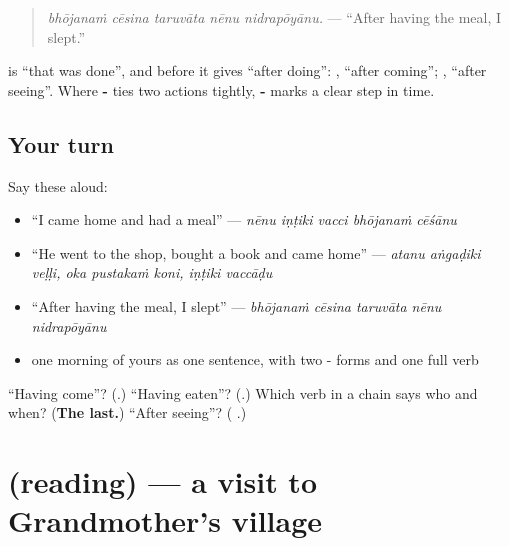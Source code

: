 \begin{quote}
\emph{bhōjanaṁ cēsina taruvāta nēnu nidrapōyānu.} — \textquotedblleft{}After having the meal, I slept.\textquotedblright{}
\end{quote}

\textbf{} is \textquotedblleft{}that was done\textquotedblright{}, and before \textbf{} it gives \textquotedblleft{}after doing\textquotedblright{}: \textbf{ }, \textquotedblleft{}after coming\textquotedblright{}; \textbf{ }, \textquotedblleft{}after seeing\textquotedblright{}. Where \textbf{-} ties two actions tightly, \textbf{- } marks a clear step in time.

\subsection*{Your turn}
Say these aloud:

\begin{itemize}
\raggedright
  \item \textquotedblleft{}I came home and had a meal\textquotedblright{} — \emph{nēnu iṇṭiki vacci bhōjanaṁ cēśānu}
  \item \textquotedblleft{}He went to the shop, bought a book and came home\textquotedblright{} — \emph{atanu aṅgaḍiki veḷḷi, oka pustakaṁ koni, iṇṭiki vaccāḍu}
  \item \textquotedblleft{}After having the meal, I slept\textquotedblright{} — \emph{bhōjanaṁ cēsina taruvāta nēnu nidrapōyānu}
  \item one morning of yours as one sentence, with two - forms and one full verb
\end{itemize}

\begin{tcolorbox}[breakable,colback=teal!4,colframe=teal!35!black,title={Before you move on}]
\textquotedblleft{}Having come\textquotedblright{}? (\textbf{}.) \textquotedblleft{}Having eaten\textquotedblright{}? (\textbf{}.) Which verb in a chain says who and when? (\textbf{The last.}) \textquotedblleft{}After seeing\textquotedblright{}? (\textbf{ }.)
\end{tcolorbox}
\section[(reading)]{(reading) — a visit to Grandmother's village}

\label{lesson:TE-C317-ammamma-gramam}




